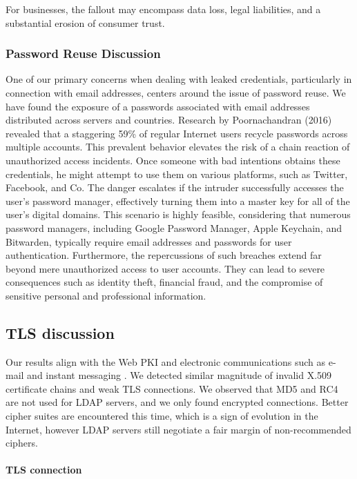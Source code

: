 For businesses, the fallout may encompass data loss, legal liabilities, and a substantial erosion of consumer trust.

\subsubsection{Password Reuse Discussion}

One of our primary concerns when dealing with leaked credentials, particularly in connection with email addresses, centers around the issue of password reuse. We have found the exposure of a  passwords associated with email addresses distributed across  servers and  countries. Research by Poornachandran \etal (2016) revealed that a staggering 59\% of regular Internet users recycle passwords across multiple accounts. This prevalent behavior elevates the risk of a chain reaction of unauthorized access incidents. Once someone with bad intentions obtains these credentials, he might attempt to use them on various platforms, such as Twitter, Facebook, and Co. The danger escalates if the intruder successfully accesses the user's password manager, effectively turning them into a master key for all of the user's digital domains. This scenario is highly feasible, considering that numerous password managers, including Google Password Manager, Apple Keychain, and Bitwarden, typically require email addresses and passwords for user authentication. Furthermore, the repercussions of such breaches extend far beyond mere unauthorized access to user accounts. They can lead to severe consequences such as identity theft, financial fraud, and the compromise of sensitive personal and professional information. 

\subsection{TLS discussion}
\label{subsec:tls_discussion}
Our results align with the Web PKI and electronic communications such as e-mail and instant messaging \cite{holz2011} \cite{holz2016}. We detected similar magnitude of invalid X.509 certificate chains and weak TLS connections. We observed that MD5 and RC4 are not used for LDAP servers, and we only found encrypted connections. Better cipher suites are encountered this time, which is a sign of evolution in the Internet, however LDAP servers still negotiate a fair margin of non-recommended ciphers.

\paragraph{TLS connection} 

